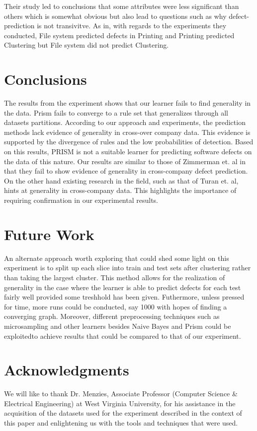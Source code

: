 \documentclass{sig-alternate}
\begin{document}
Their study led to conclusions that some attributes were less significant than others which is somewhat obvious but also lead to questions such as why defect-prediction is not transivitve. As in, with regards to the experiments they conducted, File system predicted defects in Printing and Printing predicted Clustering but File system did not predict Clustering.

\section{Conclusions}
The results from the experiment shows that our learner fails to find generality in the data.
Prism fails to converge to a rule set that generalizes through all datasets partitions. According to our
approach and experiments, the prediction methods lack evidence of generality in cross-over company data.
This evidence is supported by the divergence of rules and the low probabilities of detection. Based on
this results, PRISM is not a suitable learner for predicting software defects on the data of this nature.
Our results are similar to those of  Zimmerman et. al in that they fail to show evidence of generality in 
cross-company defect prediction. On the other hand existing research in the field, such as that of Turan et. al, hints
at generality in cross-company data. This highlights the importance of requiring confirmation in our experimental results.  

\section{Future Work}
An alternate approach worth exploring that could shed some light on this experiment is to split up each slice into train and test sets after clustering rather than taking the largest cluster. This method allows for the realization of generality in the case where the learner is able to predict defects for each test fairly well provided some treshhold has been given. Futhermore, unless pressed for time, more runs could be conducted, say 1000 with hopes of finding a converging graph. Moreover, different preprocessing techniques such as microsampling and other learners besides Naive Bayes and Prism could be exploitedto achieve results that could be compared to that of our experiment. 

\section{Acknowledgments}
We will like to thank Dr. Menzies, Associate Professor (Computer Science & Electrical Engineering) at West Virginia University, for his assistance in the acquisition of the datasets used for the experiment described in the context of this paper and enlightening us with the tools and techniques that were used. 
\end{document}
